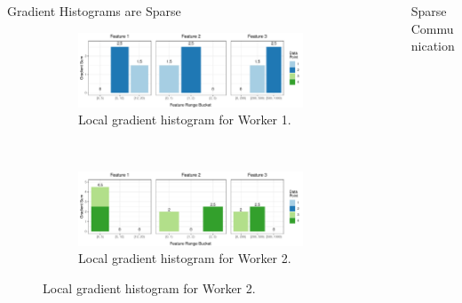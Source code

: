 \documentclass[final]{beamer}
\newlength{\sepwid}
\newlength{\onecolwid}
\begin{document}
\begin{frame}[t]
\begin{columns}[t]
\begin{column}{\onecolwid}
	\begin{block}{Gradient Histograms are Sparse}
		\begin{figure}
			\centering
			\begin{subfigure}[t]{\textwidth}
				\centering
				\includegraphics[width=\linewidth]{all-features-grad-rowdist-w1}
				\caption{Local gradient histogram for Worker 1.}
				\label{fig:grad-row-dist-w1}
			\end{subfigure}
			\\
			\begin{subfigure}[t]{\textwidth}
				\centering
				\includegraphics[width=\linewidth]{all-features-grad-rowdist-w2}
				\caption{Local gradient histogram for Worker 2.}
				\label{fig:grad-row-dist-w2}
			\end{subfigure}
		\end{figure}
	\end{block}

	
\end{column} %

\begin{column}{\sepwid}\end{column} %

\begin{column}{\onecolwid} %
	
	\begin{block}{Sparse Communication}
		

\end{block}
\end{column}
\end{columns}
\end{frame}
\end{document}
